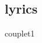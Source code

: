\documentclass[11pt]{article}
\begin{document}
\makesongtitle

%    
%
%
\begin{multicols}{2}
	\section*{lyrics}
	
\end{multicols}
{couplet1}
\end{document}
